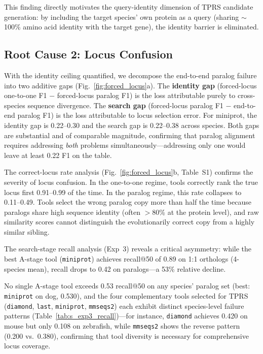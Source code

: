 This finding directly motivates the query-identity dimension of TPRS candidate generation: by including the target species' own protein as a query (sharing $\sim$100\% amino acid identity with the target gene), the identity barrier is eliminated.



\subsection{Root Cause 2: Locus Confusion}

With the identity ceiling quantified, we decompose the end-to-end paralog failure into two additive gaps (Fig.~\ref{fig:forced_locus}a). The \textbf{identity gap} (forced-locus one-to-one F1 $-$ forced-locus paralog F1) is the loss attributable purely to cross-species sequence divergence. The \textbf{search gap} (forced-locus paralog F1 $-$ end-to-end paralog F1) is the loss attributable to locus selection error. For miniprot, the identity gap is 0.22--0.30 and the search gap is 0.22--0.38 across species. Both gaps are substantial and of comparable magnitude, confirming that paralog alignment requires addressing \emph{both} problems simultaneously---addressing only one would leave at least 0.22 F1 on the table.

The correct-locus rate analysis (Fig.~\ref{fig:forced_locus}b, Table~S1) confirms the severity of locus confusion. In the one-to-one regime, tools correctly rank the true locus first 0.91--0.99 of the time. In the paralog regime, this rate collapses to 0.11--0.49. Tools select the wrong paralog copy more than half the time because paralogs share high sequence identity (often $>$80\% at the protein level), and raw similarity scores cannot distinguish the evolutionarily correct copy from a highly similar sibling.

The search-stage recall analysis (Exp~3) reveals a critical asymmetry: while the best A-stage tool (\texttt{miniprot}) achieves recall@50 of 0.89 on 1:1 orthologs (4-species mean), recall drops to 0.42 on paralogs---a 53\% relative decline.



No single A-stage tool exceeds 0.53 recall@50 on any species' paralog set (best: \texttt{miniprot} on dog, 0.530), and the four complementary tools selected for TPRS (\texttt{diamond}, \texttt{last}, \texttt{miniprot}, \texttt{mmseqs2}) each exhibit distinct species-level failure patterns (Table~\ref{tab:s_exp3_recall})---for instance, \texttt{diamond} achieves 0.420 on mouse but only 0.108 on zebrafish, while \texttt{mmseqs2} shows the reverse pattern (0.200 vs.\ 0.380), confirming that tool diversity is necessary for comprehensive locus coverage.

